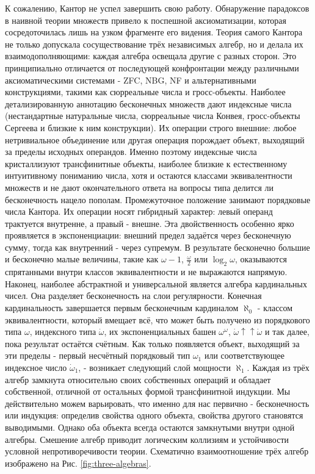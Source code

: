 \documentclass[12pt]{article}
\begin{document}
К сожалению, Кантор не успел завершить свою работу. Обнаружение парадоксов в наивной теории множеств привело к поспешной аксиоматизации, которая сосредоточилась лишь на узком фрагменте его видения. Теория самого Кантора не только допускала сосуществование трёх независимых алгебр, но и делала их взаимодополняющими: каждая алгебра освещала другие с разных сторон. Это принципиально отличается от последующей конфронтации между различными аксиоматическими системами - ZFC, NBG, NF и альтернативными конструкциями, такими как сюрреальные числа и гросс-объекты. Наиболее детализированную аннотацию бесконечных множеств дают индексные числа (нестандартные натуральные числа, сюрреальные числа Конвея, гросс-объекты Сергеева и близкие к ним конструкции). Их операции строго внешние: любое нетривиальное объединение или другая операция порождает объект, выходящий за пределы исходных операндов. Именно поэтому индексные числа кристаллизуют трансфинитные объекты, наиболее близкие к естественному интуитивному пониманию числа, хотя и остаются классами эквивалентности множеств и не дают окончательного ответа на вопросы типа делится ли бесконечность нацело пополам. Промежуточное положение занимают порядковые числа Кантора. Их операции носят гибридный характер: левый операнд трактуется внутренне, а правый - внешне. Эта двойственность особенно ярко проявляется в экспоненциации: внешний предел задаётся через бесконечную сумму, тогда как внутренний - через супремум. В результате бесконечно большие и бесконечно малые величины, такие как $\omega - 1$, $\frac{\omega}{2}$ или $\log_2\omega$, оказываются спрятанными внутри классов эквивалентности и не выражаются напрямую. Наконец, наиболее абстрактной и универсальной является алгебра кардинальных чисел. Она разделяет бесконечность на слои регулярности. Конечная кардинальность завершается первым бесконечным кардиналом $\aleph_0$ - классом эквивалентности, который вмещает всё, что может быть получено из порядкового типа $\omega$, индексного типа $\dot{\omega}$, их экспоненциальных башен $\omega^\omega$, $\dot{\omega}\uparrow\uparrow\dot{\omega}$ и так далее, пока результат остаётся счётным. Как только появляется объект, выходящий за эти пределы - первый несчётный порядковый тип $\omega_1$ или соответствующее индексное число $\dot{\omega}_1$, - возникает следующий слой мощности $\aleph_1$. Каждая из трёх алгебр замкнута относительно своих собственных операций и обладает собственной, отличной от остальных формой трансфинитной индукции. Мы действительно можем варьировать, что именно для нас первично - бесконечность или индукция: определив свойства одного объекта, свойства другого становятся выводимыми. Однако оба объекта всегда остаются замкнутыми внутри одной алгебры. Смешение алгебр приводит логическим коллизиям и устойчивости условной непротиворечивости теории. Схематично взаимоотношение трёх алгебр изображено на Рис. \ref{fig:three-algebras}.
\end{document}
